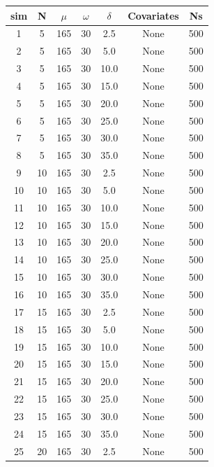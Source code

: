 \documentclass[
]{article}
\begin{document}
\begin{table}[H]
\centering\begingroup\fontsize{8}{10}\selectfont

\begin{tabular}{ccccccc}
\toprule
\textbf{sim} & \textbf{N} & \textbf{$\mu$} & \textbf{$\omega$} & \textbf{$\delta$} & \textbf{Covariates} & \textbf{Ns}\\
\midrule
\rowcolor{gray!6}  1 & 5 & 165 & 30 & 2.5 & None & 500\\
2 & 5 & 165 & 30 & 5.0 & None & 500\\
\rowcolor{gray!6}  3 & 5 & 165 & 30 & 10.0 & None & 500\\
4 & 5 & 165 & 30 & 15.0 & None & 500\\
\rowcolor{gray!6}  5 & 5 & 165 & 30 & 20.0 & None & 500\\
6 & 5 & 165 & 30 & 25.0 & None & 500\\
\rowcolor{gray!6}  7 & 5 & 165 & 30 & 30.0 & None & 500\\
8 & 5 & 165 & 30 & 35.0 & None & 500\\
\rowcolor{gray!6}  9 & 10 & 165 & 30 & 2.5 & None & 500\\
10 & 10 & 165 & 30 & 5.0 & None & 500\\
\rowcolor{gray!6}  11 & 10 & 165 & 30 & 10.0 & None & 500\\
12 & 10 & 165 & 30 & 15.0 & None & 500\\
\rowcolor{gray!6}  13 & 10 & 165 & 30 & 20.0 & None & 500\\
14 & 10 & 165 & 30 & 25.0 & None & 500\\
\rowcolor{gray!6}  15 & 10 & 165 & 30 & 30.0 & None & 500\\
16 & 10 & 165 & 30 & 35.0 & None & 500\\
\rowcolor{gray!6}  17 & 15 & 165 & 30 & 2.5 & None & 500\\
18 & 15 & 165 & 30 & 5.0 & None & 500\\
\rowcolor{gray!6}  19 & 15 & 165 & 30 & 10.0 & None & 500\\
20 & 15 & 165 & 30 & 15.0 & None & 500\\
\rowcolor{gray!6}  21 & 15 & 165 & 30 & 20.0 & None & 500\\
22 & 15 & 165 & 30 & 25.0 & None & 500\\
\rowcolor{gray!6}  23 & 15 & 165 & 30 & 30.0 & None & 500\\
24 & 15 & 165 & 30 & 35.0 & None & 500\\
\rowcolor{gray!6}  25 & 20 & 165 & 30 & 2.5 & None & 500\\

\end{tabular}
\end{table}
\end{document}
